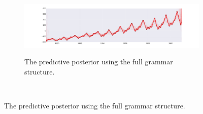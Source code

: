 \documentclass{article} %
\begin{document}
\begin{figure}
        \centering
        \begin{subfigure}[b]{\textwidth} \centering
                \includegraphics[height=3cm]{figs/airline_tree_3x.png}
                \caption{The predictive posterior using the full grammar structure.}
                \label{fig:airlineBO}
        \end{subfigure}%
        ~ %
          

\end{figure}
\end{document}
